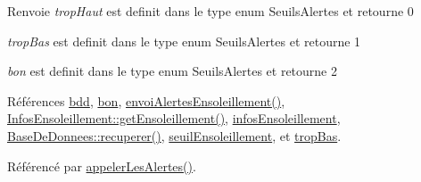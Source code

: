 \begin{DoxyReturn}{Renvoie}
{\itshape trop\+Haut} est definit dans le type enum Seuils\+Alertes et retourne 0 

{\itshape trop\+Bas} est definit dans le type enum Seuils\+Alertes et retourne 1 

{\itshape bon} est definit dans le type enum Seuils\+Alertes et retourne 2 
\end{DoxyReturn}


Références \hyperlink{class_alertes_a91e58b69d29922e8e984efb767ae5268}{bdd}, \hyperlink{parametres_8h_aaa6de8207c94675264c90b10b613368da5ac8ec3b54d90a07c6bb5a77ef971821}{bon}, \hyperlink{class_alertes_a578aa70bc7ca4ec753aa7f97e90f7f02}{envoi\+Alertes\+Ensoleillement()}, \hyperlink{class_infos_ensoleillement_a388dd7b2ae97839a779ca1384ca8e6e2}{Infos\+Ensoleillement\+::get\+Ensoleillement()}, \hyperlink{class_alertes_abd9b6ff4e9f1df3c360374cceb8d0601}{infos\+Ensoleillement}, \hyperlink{class_base_de_donnees_a77539baad389f5acf754cd2cd452403e}{Base\+De\+Donnees\+::recuperer()}, \hyperlink{class_alertes_a7f512b6d3b5bc0851757ab4d18279ccf}{seuil\+Ensoleillement}, et \hyperlink{parametres_8h_aaa6de8207c94675264c90b10b613368da4257e2f8921856770c8266f55c937295}{trop\+Bas}.



Référencé par \hyperlink{class_alertes_ad04a02dcc6e6f14da0784c7054888b05}{appeler\+Les\+Alertes()}.


